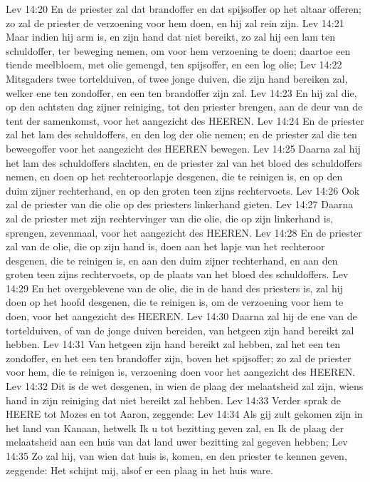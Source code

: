Lev 14:20  En de priester zal dat brandoffer en dat spijsoffer op het altaar offeren; zo zal de priester de verzoening voor hem doen, en hij zal rein zijn.
Lev 14:21  Maar indien hij arm is, en zijn hand dat niet bereikt, zo zal hij een lam ten schuldoffer, ter beweging nemen, om voor hem verzoening te doen; daartoe een tiende meelbloem, met olie gemengd, ten spijsoffer, en een log olie;
Lev 14:22  Mitsgaders twee tortelduiven, of twee jonge duiven, die zijn hand bereiken zal, welker ene ten zondoffer, en een ten brandoffer zijn zal.
Lev 14:23  En hij zal die, op den achtsten dag zijner reiniging, tot den priester brengen, aan de deur van de tent der samenkomst, voor het aangezicht des HEEREN.
Lev 14:24  En de priester zal het lam des schuldoffers, en den log der olie nemen; en de priester zal die ten beweegoffer voor het aangezicht des HEEREN bewegen.
Lev 14:25  Daarna zal hij het lam des schuldoffers slachten, en de priester zal van het bloed des schuldoffers nemen, en doen op het rechteroorlapje desgenen, die te reinigen is, en op den duim zijner rechterhand, en op den groten teen zijns rechtervoets.
Lev 14:26  Ook zal de priester van die olie op des priesters linkerhand gieten.
Lev 14:27  Daarna zal de priester met zijn rechtervinger van die olie, die op zijn linkerhand is, sprengen, zevenmaal, voor het aangezicht des HEEREN.
Lev 14:28  En de priester zal van de olie, die op zijn hand is, doen aan het lapje van het rechteroor desgenen, die te reinigen is, en aan den duim zijner rechterhand, en aan den groten teen zijns rechtervoets, op de plaats van het bloed des schuldoffers.
Lev 14:29  En het overgeblevene van de olie, die in de hand des priesters is, zal hij doen op het hoofd desgenen, die te reinigen is, om de verzoening voor hem te doen, voor het aangezicht des HEEREN.
Lev 14:30  Daarna zal hij de ene van de tortelduiven, of van de jonge duiven bereiden, van hetgeen zijn hand bereikt zal hebben.
Lev 14:31  Van hetgeen zijn hand bereikt zal hebben, zal het een ten zondoffer, en het een ten brandoffer zijn, boven het spijsoffer; zo zal de priester voor hem, die te reinigen is, verzoening doen voor het aangezicht des HEEREN.
Lev 14:32  Dit is de wet desgenen, in wien de plaag der melaatsheid zal zijn, wiens hand in zijn reiniging dat niet bereikt zal hebben.
Lev 14:33  Verder sprak de HEERE tot Mozes en tot Aaron, zeggende:
Lev 14:34  Als gij zult gekomen zijn in het land van Kanaan, hetwelk Ik u tot bezitting geven zal, en Ik de plaag der melaatsheid aan een huis van dat land uwer bezitting zal gegeven hebben;
Lev 14:35  Zo zal hij, van wien dat huis is, komen, en den priester te kennen geven, zeggende: Het schijnt mij, alsof er een plaag in het huis ware.
